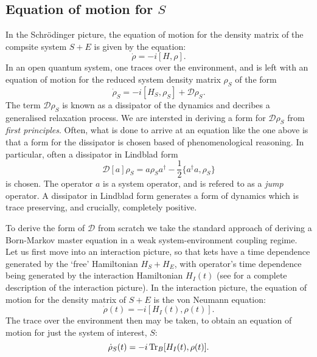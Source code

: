 \documentclass[11pt,a4paper,article,oneside]{memoir}
\begin{document}
\subsection{Equation of motion for $S$}
\par In the Schr\"odinger picture, the equation of motion for the
density matrix of the compsite system $S+E$ is given by the equation:
\begin{equation}
  \dot{\rho}=-i[H,\rho].
\end{equation}
In an open quantum system, one traces over the environment, and is
left with an equation of motion for the reduced system density matrix
$\rho_S$ of the form
\begin{equation}
  \dot{\rho}_S=-i[H_S,\rho_S]+\mathcal{D}\rho_S.
\end{equation}
The term $\mathcal{D}\rho_S$ is known as a dissipator of the dynamics
and decribes a generalised relaxation process. We are intersted in
deriving a form for $\mathcal{D}\rho_S$ from \textit{first
  principles}. Often, what is done to arrive at an equation like the
one above is that a form for the dissipator is chosen based of
phenomenological reasoning. In particular, often a dissipator in
Lindblad form
\begin{equation}
  \mathcal{D}[a]\rho_S=a\rho_Sa^\dagger-\frac{1}{2}\{a^\dagger a,
  \rho_S\}
\end{equation}
is chosen. The operator $a$ is a system operator, and is refered to as
a \textit{jump} operator. A dissipator in Lindblad form generates a
form of dynamics which is trace preserving, and crucially, completely
positive.  \par To derive the form of $\mathcal{D}$ from scratch we
take the standard approach of deriving a Born-Markov master equation
in a weak system-environment coupling regime. Let us first move into
an interaction picture, so that kets have a time dependence generated
by the `free' Hamiltonian $H_S+H_E$, with operator's time dependence
being generated by the interaction Hamiltonian $H_I(t)$ (see
\cite{Breuer2002} for a complete description of the interaction
picture). In the interaction picture, the equation of motion for the
density matrix of $S+E$ is the von Neumann equation:
\begin{equation}
  \dot{\rho}(t)=-i[H_I(t),\rho(t)].
  \label{eqn:vonNeumann}
\end{equation}
The trace over the environment then may be taken, to obtain an
equation of motion for just the system of interest, $S$:
\begin{equation}
  \dot{\rho}_S(t)=-i\operatorname{Tr}_B[H_I(t),\rho(t)].
  \label{eqn:vonNeumann2}
\end{equation}
\end{document}
